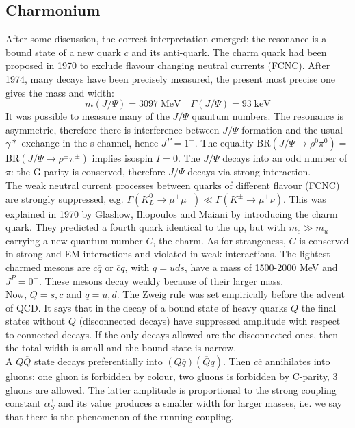 \documentclass[10.75pt,a4paper,openright,bottom=2cm]{article}
\begin{document}
\subsection{Charmonium}
After some discussion, the correct interpretation emerged: the resonance is a bound state of a new quark $c$ and its anti-quark. The charm quark had been proposed in 1970 to exclude flavour changing neutral currents (FCNC). After 1974, many decays have been precisely measured, the present most precise one gives the mass and width:
\[
m(J/\Psi)=3097\;\text{MeV} \quad \Gamma(J/\Psi)=93\;\text{keV}
\]
It was possible to measure many of the $J/\Psi$ quantum numbers. The resonance is asymmetric, therefore there is interference between $J/\Psi$ formation and the usual $\gamma*$ exchange in the s-channel, hence $J^P=1^-$. The equality BR$(J/\Psi\to\rho^0\pi^0)=$BR$(J/\Psi\to\rho^\pm\pi^\pm)$ implies isospin $I=0$. The $J/\Psi$ decays into an odd number of $\pi$: the G-parity is conserved, therefore $J/\Psi$ decays via strong interaction.\\
The weak neutral current processes between quarks of different flavour (FCNC) are strongly suppressed, e.g. $\Gamma(K_L^0\to\mu^+\mu^-)\ll\Gamma(K^\pm\to\mu^\pm\nu)$. This was explained in 1970 by Glashow, Iliopoulos and Maiani by introducing the charm quark. They predicted a fourth quark identical to the up, but with $m_c\gg m_u$ carrying a new quantum number $C$, the charm. As for strangeness, $C$ is conserved in strong and EM interactions and violated in weak interactions. The lightest charmed mesons are $c\overline{q}$ or $\overline{c}q$, with $q=uds$, have a mass of 1500-2000 MeV and $J^P=0^-$. These mesons decay weakly because of their larger mass.\\
Now, $Q=s,c$ and $q=u,d$. The Zweig rule was set empirically before the advent of QCD. It says that in the decay of a bound state of heavy quarks $Q$ the final states without $Q$ (disconnected decays) have suppressed amplitude with respect to connected decays. If the only decays allowed are the disconnected ones, then the total width is small and the bound state is narrow.\\
A $Q\overline{Q}$ state decays preferentially into $(Q\overline{q})(\overline{Q}q)$. Then $c\overline{c}$ annihilates into gluons: one gluon is forbidden by colour, two gluons is forbidden by C-parity, 3 gluons are allowed. The latter amplitude is proportional to the strong coupling constant $\alpha_S^3$ and its value produces a smaller width for larger masses, i.e. we say that there is the phenomenon of the running coupling.\\
\end{document}
